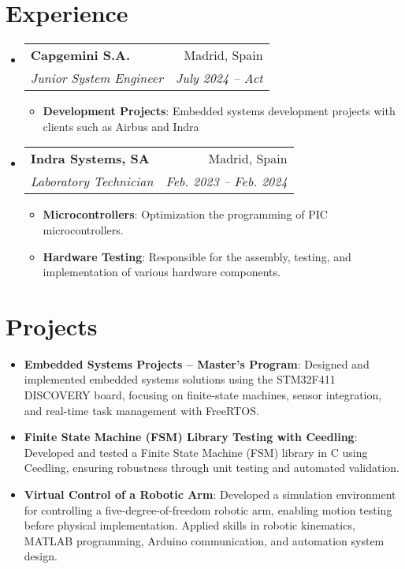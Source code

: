\documentclass[letterpaper,11pt]{article}
\makeatletter
\newcommand{\resumeItem}[2]{
  \item\small{
    \textbf{#1}{: #2 \vspace{-2pt}}
  }
}
\newcommand{\resumeSubheading}[4]{
  \vspace{-1pt}\item
    \begin{tabular*}{0.97\textwidth}{l@{\extracolsep{\fill}}r}
      \textbf{#1} & #2 \\
      \textit{\small#3} & \textit{\small #4} \\
    \end{tabular*}\vspace{-5pt}
}
\newcommand{\resumeSubItem}[2]{\resumeItem{#1}{#2}\vspace{-4pt}}
\newcommand{\resumeSubHeadingListStart}{\begin{itemize}[leftmargin=*]}
\newcommand{\resumeSubHeadingListEnd}{\end{itemize}}
\newcommand{\resumeItemListStart}{\begin{itemize}}
\newcommand{\resumeItemListEnd}{\end{itemize}\vspace{-5pt}}
\makeatother
\begin{document}
\section{Experience}
    \smallskip
    \resumeSubHeadingListStart

        \resumeSubheading
            { Capgemini S.A. }{ Madrid, Spain }
            {Junior System Engineer}{ July 2024 -- Act }
        \resumeItemListStart
            \resumeItem{Development Projects}
            {Embedded systems development projects with clients such as Airbus and Indra}
        \resumeItemListEnd

        \bigskip
    
        \resumeSubheading
            { Indra Systems, SA }{Madrid, Spain}
            {Laboratory Technician}{Feb. 2023 -- Feb. 2024}
        \resumeItemListStart
            \resumeItem{Microcontrollers}
            {Optimization the programming of PIC microcontrollers.}
            \resumeItem{Hardware Testing}
            {Responsible for the assembly, testing, and implementation of various hardware components.}
        \resumeItemListEnd   

    \resumeSubHeadingListEnd

\smallskip
\section{Projects}
  \resumeSubHeadingListStart
    \resumeSubItem{Embedded Systems Projects – Master’s Program}
      {Designed and implemented embedded systems solutions using the STM32F411 DISCOVERY board, focusing on finite-state machines, sensor integration, and real-time task management with FreeRTOS.}
    \resumeSubItem{Finite State Machine (FSM) Library Testing with Ceedling}
      {Developed and tested a Finite State Machine (FSM) library in C using Ceedling, ensuring robustness through unit testing and automated validation.}
    \resumeSubItem{Virtual Control of a Robotic Arm}
      {Developed a simulation environment for controlling a five-degree-of-freedom robotic arm, enabling motion testing before physical implementation. Applied skills in robotic kinematics, MATLAB programming, Arduino communication, and automation system design.}
  \resumeSubHeadingListEnd

\smallskip
\end{document}
